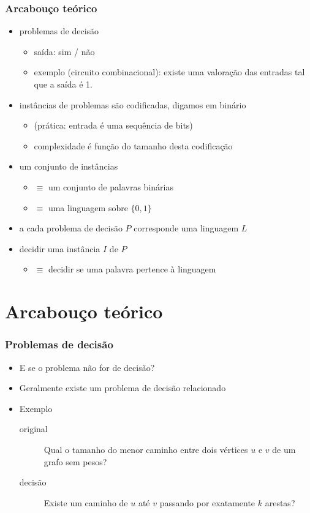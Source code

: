 \documentclass{beamer}
\begin{document}
\begin{frame}
\frametitle{Arcabouço teórico}

\begin{itemize}
\item problemas de \alert{decisão}
  \begin{itemize}
  \item saída: sim / não
  \item exemplo (circuito combinacional): existe uma valoração das entradas tal
    que a saída é 1.
  \end{itemize}
\item instâncias de problemas são \alert{codificadas}, digamos em binário
  \begin{itemize}
  \item (prática: entrada é uma sequência de bits)
  \item complexidade é função do tamanho desta codificação
  \end{itemize}
\item um conjunto de instâncias
  \begin{itemize}
    \item $\equiv$ um conjunto de palavras binárias
    \item $\equiv$ uma linguagem sobre $\{0, 1\}$
  \end{itemize}
\item a cada problema de decisão $P$ corresponde uma linguagem $L$
\item decidir uma instância $I$ de $P$
  \begin{itemize}
  \item $\equiv$ decidir se uma palavra pertence à linguagem
  \end{itemize}
\end{itemize}

\end{frame}

\section{Arcabouço teórico}

\begin{frame}
\frametitle{Problemas de decisão}

\begin{itemize}
\item E se o problema não for de decisão?

\item Geralmente existe um problema de decisão relacionado

\item Exemplo
  \begin{description}
  \item[original] Qual o tamanho do menor caminho entre dois
    vértices $u$ e $v$ de um grafo sem pesos?
  \item[decisão] Existe um caminho de $u$ até $v$ passando por
    exatamente $k$ arestas?
  \end{description}

\end{itemize}

\end{frame}
\end{document}
